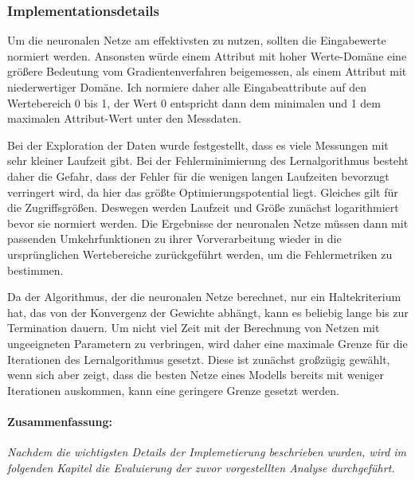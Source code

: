 \documentclass[
	12pt,
	a4paper,
	BCOR10mm,
	DIV14,
	listof=totoc,
	bibliography=totoc,
	headsepline
]{scrreprt}
\begin{document}
\subsubsection{Implementationsdetails}
Um die neuronalen Netze am effektivsten zu nutzen, sollten die Eingabewerte normiert werden. Ansonsten würde einem Attribut mit hoher Werte-Domäne eine größere Bedeutung vom Gradientenverfahren beigemessen, als einem Attribut mit niederwertiger Domäne. 
Ich normiere daher alle Eingabeattribute auf den Wertebereich 0 bis 1, der Wert 0 entspricht dann dem minimalen und 1 dem maximalen Attribut-Wert unter den Messdaten.\medskip

Bei der Exploration der Daten wurde festgestellt, dass es viele Messungen mit sehr kleiner Laufzeit gibt.
Bei der Fehlerminimierung des Lernalgorithmus besteht daher die Gefahr, dass der Fehler für die wenigen langen Laufzeiten bevorzugt verringert wird, da hier das größte Optimierungspotential liegt. Gleiches gilt für die Zugriffsgrößen.
Deswegen werden Laufzeit und Größe zunächst logarithmiert bevor sie normiert werden.
Die Ergebnisse der neuronalen Netze müssen dann mit passenden Umkehrfunktionen zu ihrer Vorverarbeitung wieder in die ursprünglichen Wertebereiche zurückgeführt werden, um die Fehlermetriken zu bestimmen.\medskip

Da der Algorithmus, der die neuronalen Netze berechnet, nur ein Haltekriterium hat, das von der Konvergenz der Gewichte abhängt, kann es beliebig lange bis zur Termination dauern.
Um nicht viel Zeit mit der Berechnung von Netzen mit ungeeigneten Parametern zu verbringen, wird daher eine maximale Grenze für die Iterationen des Lernalgorithmus gesetzt. Diese ist zunächst großzügig gewählt, wenn sich aber zeigt, dass die besten Netze eines Modells bereits mit weniger Iterationen auskommen, kann eine geringere Grenze gesetzt werden.

\paragraph{Zusammenfassung:}
\textit{
	Nachdem die wichtigsten Details der Implemetierung beschrieben wurden, wird im folgenden Kapitel die Evaluierung der zuvor vorgestellten Analyse durchgeführt.
}
\end{document}

